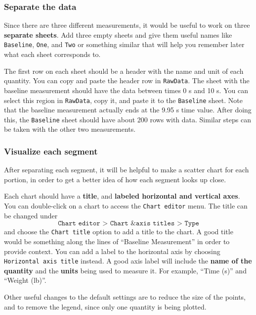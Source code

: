 \subsubsection{Separate the data}
Since there are three different measurements, it would be useful to work on three \textbf{separate sheets}. Add three empty sheets and give them useful names like \texttt{Baseline}, \texttt{One}, and \texttt{Two} or something similar that will help you remember later what each sheet corresponds to.

The first row on each sheet should be a header with the name and unit of each quantity. You can copy and paste the header row in \texttt{RawData}. The sheet with the baseline measurement should have the data between times 0 s and 10 s. You can select this region in \texttt{RawData}, copy it, and paste it to the \texttt{Baseline} sheet. Note that the baseline measurement actually ends at the 9.95 s time value. After doing this, the \texttt{Baseline} sheet should have about 200 rows with data. Similar steps can be taken with the other two measurements.
\subsubsection{Visualize each segment}
After separating each segment, it will be helpful to make a scatter chart for each portion, in order to get a better idea of how each segment looks up close.

Each chart should have a \textbf{title}, and \textbf{labeled horizontal and vertical axes}. You can double-click on a chart to access the \texttt{Chart editor} menu. The title can be changed under
\begin{equation}
    \texttt{Chart editor > Chart \& axis titles > Type}
\end{equation}
and choose the \texttt{Chart title} option to add a title to the chart. A good title would be something along the lines of ``Baseline Measurement'' in order to provide context. You can add a label to the horizontal axis by choosing \texttt{Horizontal axis title} instead. A good axis label will include the \textbf{name of the quantity} and the \textbf{units} being used to measure it. For example, ``Time (s)'' and ``Weight (lb)''.

Other useful changes to the default settings are to reduce the size of the points, and to remove the legend, since only one quantity is being plotted.
